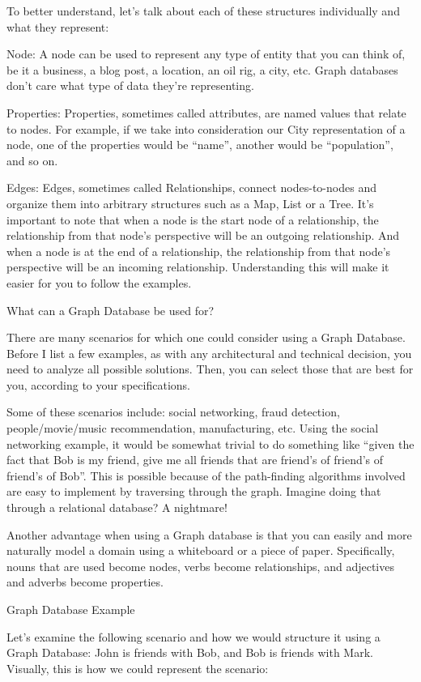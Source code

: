 \documentclass[10pt, conference, compsocconf]{IEEEtran}
\begin{document}
To better understand, let’s talk about each of these structures individually and what they represent:

Node: A node can be used to represent any type of entity that you can think of, be it a business, a blog post, a location, an oil rig, a city, etc. Graph databases don’t care what type of data they’re representing.

Properties: Properties, sometimes called attributes, are named values that relate to nodes. For example, if we take into consideration our City representation of a node, one of the properties would be “name”, another would be “population”, and so on.

Edges: Edges, sometimes called Relationships, connect nodes-to-nodes and organize them into arbitrary structures such as a Map, List or a Tree. It’s important to note that when a node is the start node of a relationship, the relationship from that node’s perspective will be an outgoing relationship. And when a node is at the end of a relationship, the relationship from that node’s perspective will be an incoming relationship. Understanding this will make it easier for you to follow the examples.

What can a Graph Database be used for?

There are many scenarios for which one could consider using a Graph Database. Before I list a few examples, as with any architectural and technical decision, you need to analyze all possible solutions. Then, you can select those that are best for you, according to your specifications.

Some of these scenarios include: social networking, fraud detection, people/movie/music recommendation, manufacturing, etc. Using the social networking example, it would be somewhat trivial to do something like “given the fact that Bob is my friend, give me all friends that are friend’s of friend’s of friend’s of Bob”. This is possible because of the path-finding algorithms involved are easy to implement by traversing through the graph. Imagine doing that through a relational database? A nightmare!

Another advantage when using a Graph database is that you can easily and more naturally model a domain using a whiteboard or a piece of paper. Specifically, nouns that are used become nodes, verbs become relationships, and adjectives and adverbs become properties.

Graph Database Example

Let’s examine the following scenario and how we would structure it using a Graph Database: John is friends with Bob, and Bob is friends with Mark. Visually, this is how we could represent the scenario:
\end{document}
